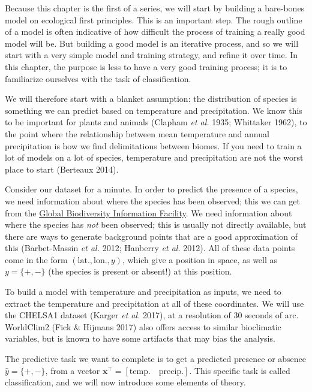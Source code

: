 \documentclass[
  letterpaper,
]{scrbook}
\begin{document}
Because this chapter is the first of a series, we will start by building
a bare-bones model on ecological first principles. This is an important
step. The rough outline of a model is often indicative of how difficult
the process of training a really good model will be. But building a good
model is an iterative process, and so we will start with a very simple
model and training strategy, and refine it over time. In this chapter,
the purpose is less to have a very good training process; it is to
familiarize ourselves with the task of classification.

We will therefore start with a blanket assumption: the distribution of
species is something we can predict based on temperature and
precipitation. We know this to be important for plants and animals
(Clapham \emph{et al.} 1935; Whittaker 1962), to the point where the
relationship between mean temperature and annual precipitation is how we
find delimitations between biomes. If you need to train a lot of models
on a lot of species, temperature and precipitation are not the worst
place to start (Berteaux 2014).

Consider our dataset for a minute. In order to predict the presence of a
species, we need information about where the species has been observed;
this we can get from the \href{https://www.gbif.org/}{Global
Biodiversity Information Facility}. We need information about where the
species has \emph{not} been observed; this is usually not directly
available, but there are ways to generate background points that are a
good approximation of this (Barbet-Massin \emph{et al.} 2012; Hanberry
\emph{et al.} 2012). All of these data points come in the form
\((\text{lat.}, \text{lon.}, y)\), which give a position in space, as
well as \(y = \{+,-\}\) (the species is present or absent!) at this
position.

To build a model with temperature and precipitation as inputs, we need
to extract the temperature and precipitation at all of these
coordinates. We will use the CHELSA1 dataset (Karger \emph{et al.}
2017), at a resolution of 30 seconds of arc. WorldClim2 (Fick \& Hijmans
2017) also offers access to similar bioclimatic variables, but is known
to have some artifacts that may bias the analysis.

The predictive task we want to complete is to get a predicted presence
or absence \(\hat y = \{+,-\}\), from a vector
\(\mathbf{x}^\top = [\text{temp.} \quad \text{precip.}]\). This specific
task is called classification, and we will now introduce some elements
of theory.
\end{document}
